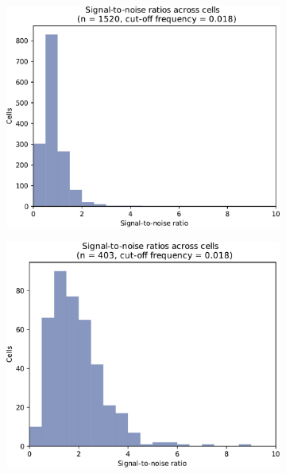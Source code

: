 \begin{figure}
  \centering
  \begin{subfigure}[t]{0.3\textwidth}
   \centering
   \includegraphics[width=\textwidth]{limiting_snr_edit}
   \caption{
   }
   \label{fig:biology-lowglc-snr}
  \end{subfigure}%
  \begin{subfigure}[t]{0.3\textwidth}
   \centering
   \includegraphics[width=\textwidth]{pyruvate_snr_edit}
   \caption{
   }
   \label{fig:biology-pyruvate-snr}
  \end{subfigure}%

\end{figure}
